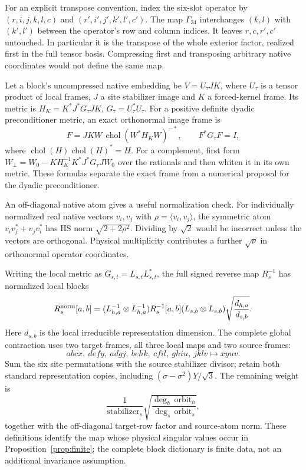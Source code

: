 \documentclass[11pt,a4paper]{article}
\theoremstyle{definition}\newtheorem{definition}[theorem]{Definition}
\theoremstyle{remark}\newtheorem{remark}[theorem]{Remark}
\numberwithin{equation}{section}
\begin{document}
For an explicit transpose convention, index the six-slot operator by
$(r,i,j,k,l,c)$ and $(r',i',j',k',l',c')$.
The map $\Gamma_{34}$ interchanges $(k,l)$ with $(k',l')$
between the operator's row and column indices. It leaves
$r,c,r',c'$ untouched. In particular it is the transpose of the
whole exterior factor, realized first in the full tensor basis.
Compressing first and transposing arbitrary native coordinates
would not define the same map.

Let a block's uncompressed native embedding be $V=U_\tau JK$,
where $U_\tau$ is a tensor product of local frames, $J$ a site
stabilizer image and $K$ a forced-kernel frame.
Its metric is
$H_K=K^*J^*G_\tau JK$, $G_\tau=U_\tau^*U_\tau$.
For a positive definite dyadic preconditioner metric, an exact
orthonormal image frame is
\[
F=JKW\,\operatorname{chol}(W^*H_KW)^{-*},
\qquad F^*G_\tau F=I,
\]
where $\operatorname{chol}(H)\operatorname{chol}(H)^*=H$.
For a complement, first form
$W_\perp=W_0-KH_K^{-1}K^*J^*G_\tau JW_0$
over the rationals and then whiten it in its own metric.
These formulas separate the exact frame from a numerical proposal
for the dyadic preconditioner.

An off-diagonal native atom gives a useful normalization check.
For individually normalized real native vectors $v_i,v_j$ with
$\rho=\langle v_i,v_j\rangle$, the symmetric atom
$v_iv_j^*+v_jv_i^*$ has HS norm $\sqrt{2+2\rho^2}$.
Dividing by $\sqrt2$ would be incorrect unless the vectors are
orthogonal. Physical multiplicity contributes a further
$\sqrt{\nu}$ in orthonormal operator coordinates.

Writing the local metric as $G_{s,t}=L_{s,t}L_{s,t}^*$, the full
signed reverse map $R_s^{-1}$ has normalized local blocks
\begin{equation}
R_s^{\rm norm}[a,b]
=(L_{h,a}^{-1}\otimes L_{h,a}^{-1})
 R_s^{-1}[a,b](L_{s,b}\otimes L_{s,b})
 \sqrt{\frac{d_{h,a}}{d_{s,b}}}.
\label{eq:localtransfer}
\end{equation}
Here $d_{s,b}$ is the local irreducible representation dimension.
The complete global contraction uses two target frames, all three
local maps and two source frames:
\[
abcx,\ defy,\ adgj,\ behk,\ cfil,\ ghiu,\ jklv
\longmapsto xyuv.
\]
Sum the six site permutations with the source stabilizer divisor;
retain both standard representation copies, including
$(\sigma-\sigma^2)Y/\sqrt3$.
The remaining weight is
\[
\frac{1}{\mathrm{stabilizer}_s}
\sqrt{\frac{\deg_h\,\mathrm{orbit}_h}{\deg_s\,\mathrm{orbit}_s}},
\]
together with the off-diagonal target-row factor and source-atom norm.
These definitions identify the map whose physical singular values
occur in Proposition~\ref{prop:finite}; the complete block dictionary
is finite data, not an additional invariance assumption.
\end{document}
